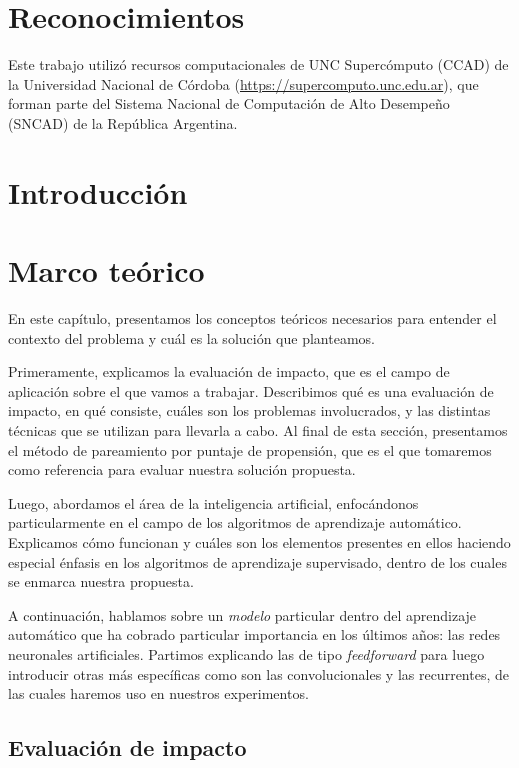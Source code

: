 \documentclass[a4paper,12pt,spanish]{book}
\begin{document}
\thispagestyle{empty}
\chapter*{Reconocimientos}
Este trabajo utilizó recursos computacionales de UNC Supercómputo (CCAD) de la Universidad
Nacional de Córdoba
({\href{https://supercomputo.unc.edu.ar}{https://supercomputo.unc.edu.ar}}), que forman
parte del Sistema Nacional de Computación de Alto Desempeño (SNCAD) de la República
Argentina.


\tableofcontents
\clearpage

\chapter{Introducción}


\chapter{Marco teórico}
En este capítulo, presentamos los conceptos teóricos necesarios para entender el contexto
del problema y cuál es la solución que planteamos.

Primeramente, explicamos la evaluación de impacto, que es el campo de aplicación sobre el
que vamos a trabajar. Describimos qué es una evaluación de impacto, en qué consiste,
cuáles son los problemas involucrados, y las distintas técnicas que se utilizan para
llevarla a cabo. Al final de esta sección, presentamos el método de pareamiento por
puntaje de propensión, que es el que tomaremos como referencia para evaluar nuestra
solución propuesta.

Luego, abordamos el área de la inteligencia artificial, enfocándonos particularmente
en el campo de los algoritmos de aprendizaje automático. Explicamos cómo funcionan y
cuáles son los elementos presentes en ellos haciendo especial énfasis en los algoritmos de
aprendizaje supervisado, dentro de los cuales se enmarca nuestra propuesta.

A continuación, hablamos sobre un \textit{modelo} particular dentro del aprendizaje
automático que ha cobrado particular importancia en los últimos años: las redes neuronales
artificiales. Partimos explicando las de tipo \textit{feedforward} para luego introducir
otras más específicas como son las convolucionales y las recurrentes, de las cuales
haremos uso en nuestros experimentos.

\section{Evaluación de impacto}

\end{document}
